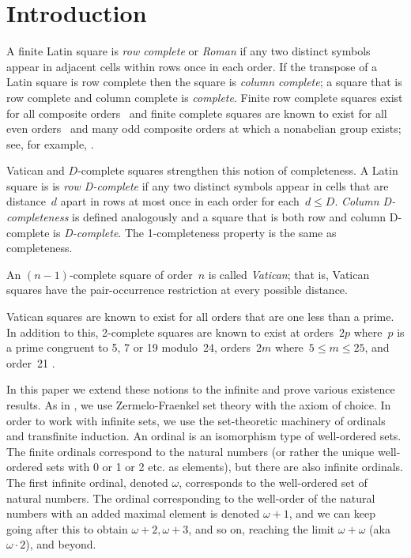 \documentclass[12pt,a4paper]{article}
\begin{document}
\section{Introduction}\label{sec:intro}


A finite Latin square is {\em row complete} or {\em Roman} if  any two distinct symbols appear in adjacent cells within rows once in each order.  If the transpose of a Latin square is row complete then the square is {\em column complete}; a square that is row complete and column complete is {\em complete}.  Finite row complete squares exist for all composite orders~\cite{Higham98} and finite complete squares are known to exist for all even orders~\cite{Gordon61} and many odd composite orders at which a nonabelian group exists; see, for example, \cite{Ollis14}.

Vatican and $D$-complete  squares strengthen this notion of completeness. 
A Latin square is is {\em row D-complete} if any two distinct symbols appear in cells that are distance~$d$ apart in rows at most once in each order for each~$d \leq D$. {\em Column D-completeness} is defined analogously and a square that is both row and column D-complete is {\em D-complete}.  The 1-completeness property is the same as completeness.

An $(n-1)$-complete square of order~$n$ is called {\em Vatican}; that is, Vatican squares have the pair-occurrence restriction at every possible distance.

Vatican squares are known to exist for all orders that are one less than a prime.  In addition to this, 2-complete squares are known to exist at orders~$2p$ where~$p$ is a prime congruent to 5, 7 or 19 modulo~24, orders~$2m$ where~$5 \leq m \leq 25$, and order~21 \cite{TuscanCRC,OllisTFSG}.


In this paper we extend these notions to the infinite and prove various existence results.  As in \cite{CW02}, we use Zermelo-Fraenkel set theory with the axiom of choice. In order to work with infinite sets, we use the set-theoretic machinery of ordinals and transfinite induction. An ordinal is an isomorphism type of well-ordered sets. The finite ordinals correspond to the natural numbers (or rather
the unique well-ordered sets with 0 or 1 or 2 etc. as elements), but there are also infinite ordinals.
The first infinite ordinal, denoted $\omega$, corresponds to the well-ordered set of natural numbers.
The ordinal corresponding to the well-order of the natural numbers with an added maximal element is
denoted $\omega+1$, and we can keep going after this to obtain $\omega+2, \omega+3$, and so on, reaching the limit $\omega+\omega$ (aka $\omega\cdot 2$), and beyond. 
\end{document}
